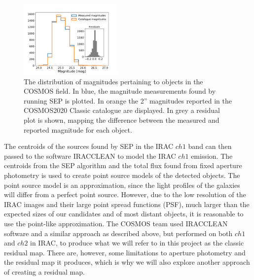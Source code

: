 \begin{figure}
    \centering %
    \includegraphics[trim={0.5cm 0 2cm 1.8cm},clip,width=0.45\textwidth]{Code/Saved_Figures/Mag_hist.pdf}
    \caption{The distribution of magnitudes pertaining to objects in the COSMOS field. In blue, the magnitude measurements found by running SEP is plotted. In orange the 2'' magnitudes reported in the COSMOS2020 Classic catalogue are displayed. In grey a residual plot is shown, mapping the difference between the measured and reported magnitude for each object.}
    \label{mag_hist}  
\end{figure}

The centroids of the sources found by SEP in the IRAC $ch1$ band can then passed to the software IRACCLEAN \cite{Hsieh_2012_IRACCLEAN} to model the IRAC $ch1$ emission. The centroids from the SEP algorithm and the total flux found from fixed aperture photometry is used to create point source models of the detected objects. The point source model is an approximation, since the light profiles of the galaxies will differ from a perfect point source. However, due to the low resolution of the IRAC images and their large point spread functions (PSF), much larger than the expected sizes of our candidates and of most distant objects, it is reasonable to use the point-like approximation. The COSMOS team used IRACCLEAN software and a similar approach as described above, but performed on both $ch1$ and $ch2$ in IRAC, to produce what we will refer to in this project as the classic residual map. There are, however, some limitations to aperture photometry and the residual map it produces, which is why we will also explore another approach of creating a residual map.


